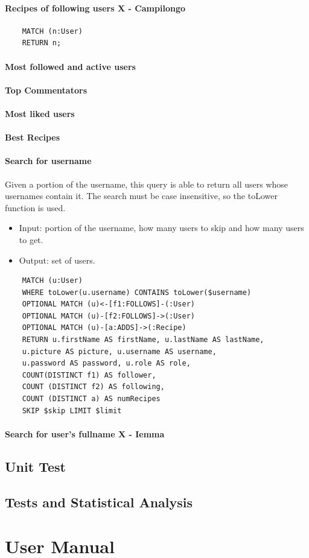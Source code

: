 \documentclass[a4paper]{report}
\begin{document}
\subsubsection{Recipes of following users X - Campilongo }
\lstset{ language=java}
\begin{lstlisting}
	MATCH (n:User)
	RETURN n;
\end{lstlisting}  
\subsubsection{Most followed and active users}
\subsubsection{Top Commentators}
\subsubsection{Most liked users}
\subsubsection{Best Recipes}
\subsubsection{Search for username}
Given a portion of the username, this query is able to return all users whose usernames contain it. The search must be case insensitive, so the toLower function is used. 
\begin{itemize}
\item Input: portion of the username, how many users to skip and how many users to get.
\item Output: set of users.	
\end{itemize}
\lstset{ language=java}
\begin{lstlisting}
	MATCH (u:User)
	WHERE toLower(u.username) CONTAINS toLower($username)
	OPTIONAL MATCH (u)<-[f1:FOLLOWS]-(:User)
	OPTIONAL MATCH (u)-[f2:FOLLOWS]->(:User)
	OPTIONAL MATCH (u)-[a:ADDS]->(:Recipe)
	RETURN u.firstName AS firstName, u.lastName AS lastName, 
	u.picture AS picture, u.username AS username, 
	u.password AS password, u.role AS role, 
	COUNT(DISTINCT f1) AS follower,
	COUNT (DISTINCT f2) AS following, 
	COUNT (DISTINCT a) AS numRecipes
	SKIP $skip LIMIT $limit
\end{lstlisting} 
\subsubsection{Search for user's fullname X - Iemma}

\section{Unit Test}
\section{Tests and Statistical Analysis}

\chapter{User Manual}
\end{document}
